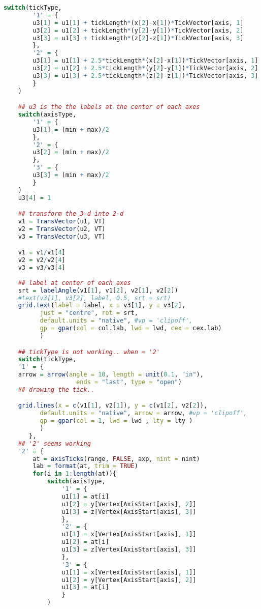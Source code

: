 \begin{lstlisting}[language = R]
    switch(tickType,
        '1' = { 
        u3[1] = u1[1] + tickLength*(x[2]-x[1])*TickVector[axis, 1]
        u3[2] = u1[2] + tickLength*(y[2]-y[1])*TickVector[axis, 2]
        u3[3] = u1[3] + tickLength*(z[2]-z[1])*TickVector[axis, 3]
        },
        '2' = {
        u3[1] = u1[1] + 2.5*tickLength*(x[2]-x[1])*TickVector[axis, 1]
        u3[2] = u1[2] + 2.5*tickLength*(y[2]-y[1])*TickVector[axis, 2]
        u3[3] = u1[3] + 2.5*tickLength*(z[2]-z[1])*TickVector[axis, 3]
        }
    )

    ## u3 is the the labels at the center of each axes
    switch(axisType,
        '1' = {
        u3[1] = (min + max)/2
        },
        '2' = {
        u3[2] = (min + max)/2
        },
        '3' = {
        u3[3] = (min + max)/2
        }
    )
    u3[4] = 1

    ## transform the 3-d into 2-d
    v1 = TransVector(u1, VT)
    v2 = TransVector(u2, VT)
    v3 = TransVector(u3, VT)

    v1 = v1/v1[4]
    v2 = v2/v2[4]
    v3 = v3/v3[4]
      
    ## label at center of each axes
    srt = labelAngle(v1[1], v1[2], v2[1], v2[2])
    #text(v3[1], v3[2], label, 0.5, srt = srt)
    grid.text(label = label, x = v3[1], y = v3[2],
          just = "centre", rot = srt,
          default.units = "native", #vp = 'clipoff',
          gp = gpar(col = col.lab, lwd = lwd, cex = cex.lab)
          )

    ## tickType is not working.. when = '2'
    switch(tickType,
    '1' = {
    arrow = arrow(angle = 10, length = unit(0.1, "in"),
                    ends = "last", type = "open")  
    ## drawing the tick..

    grid.lines(x = c(v1[1], v2[1]), y = c(v1[2], v2[2]),
          default.units = "native", arrow = arrow, #vp = 'clipoff',
          gp = gpar(col = 1, lwd = lwd , lty = lty )
          )
       },
    ## '2' seems working
    '2' = {
        at = axisTicks(range, FALSE, axp, nint = nint)
        lab = format(at, trim = TRUE)
        for(i in 1:length(at)){
            switch(axisType, 
                '1' = {
                u1[1] = at[i]
                u1[2] = y[Vertex[AxisStart[axis], 2]]
                u1[3] = z[Vertex[AxisStart[axis], 3]]
                },
                '2' = {
                u1[1] = x[Vertex[AxisStart[axis], 1]]
                u1[2] = at[i]
                u1[3] = z[Vertex[AxisStart[axis], 3]]
                },
                '3' = {
                u1[1] = x[Vertex[AxisStart[axis], 1]]
                u1[2] = y[Vertex[AxisStart[axis], 2]]
                u1[3] = at[i]
                }
            )
            

\end{lstlisting}

